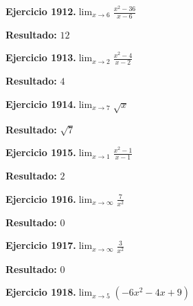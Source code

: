 \documentclass[10pt,a4paper]{article}
\begin{document}
\newpage
\begin{ejbox}
\textbf{Ejercicio 1912.}\quad $\lim_{x\to 6} \frac{x^2-36}{x-6}$
\end{ejbox}

\begin{solbox}
\textbf{Resultado:} \(\displaystyle 12\)
\end{solbox}

\begin{ejbox}
\textbf{Ejercicio 1913.}\quad $\lim_{x\to 2} \frac{x^2-4}{x-2}$
\end{ejbox}

\begin{solbox}
\textbf{Resultado:} \(\displaystyle 4\)
\end{solbox}

\begin{ejbox}
\textbf{Ejercicio 1914.}\quad $\lim_{x\to 7} \sqrt{x}$
\end{ejbox}

\begin{solbox}
\textbf{Resultado:} \(\displaystyle \sqrt{7}\)
\end{solbox}

\newpage
\begin{ejbox}
\textbf{Ejercicio 1915.}\quad $\lim_{x\to 1} \frac{x^2-1}{x-1}$
\end{ejbox}

\begin{solbox}
\textbf{Resultado:} \(\displaystyle 2\)
\end{solbox}

\begin{ejbox}
\textbf{Ejercicio 1916.}\quad $\lim_{x\to \infty} \frac{7}{x^2}$
\end{ejbox}

\begin{solbox}
\textbf{Resultado:} \(\displaystyle 0\)
\end{solbox}

\begin{ejbox}
\textbf{Ejercicio 1917.}\quad $\lim_{x\to \infty} \frac{3}{x^2}$
\end{ejbox}

\begin{solbox}
\textbf{Resultado:} \(\displaystyle 0\)
\end{solbox}

\newpage
\begin{ejbox}
\textbf{Ejercicio 1918.}\quad $\lim_{x\to 5} (-6x^2 -4x +9)$
\end{ejbox}
\end{document}
